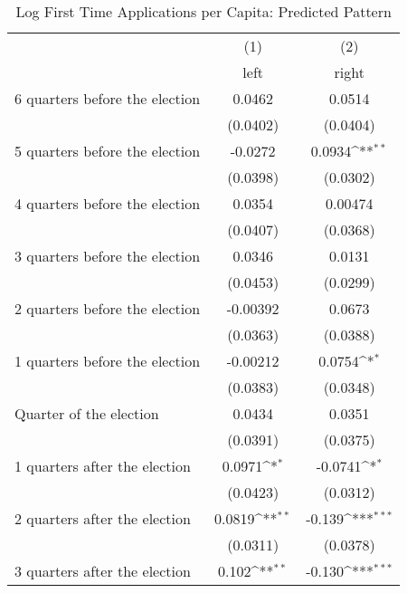 \begin{table}[htbp]\centering
\def\sym#1{\ifmmode^{#1}\else\(^{#1}\)\fi}
\caption{Log First Time Applications per Capita: Predicted Pattern}
\begin{tabular}{l*{2}{c}}
\hline\hline
                    &\multicolumn{1}{c}{(1)}&\multicolumn{1}{c}{(2)}\\
                    &\multicolumn{1}{c}{left}&\multicolumn{1}{c}{right}\\
\hline
 6 quarters before the election&      0.0462         &      0.0514         \\
                    &    (0.0402)         &    (0.0404)         \\
[1em]
 5 quarters before the election&     -0.0272         &      0.0934\sym{**} \\
                    &    (0.0398)         &    (0.0302)         \\
[1em]
 4 quarters before the election&      0.0354         &     0.00474         \\
                    &    (0.0407)         &    (0.0368)         \\
[1em]
 3 quarters before the election&      0.0346         &      0.0131         \\
                    &    (0.0453)         &    (0.0299)         \\
[1em]
 2 quarters before the election&    -0.00392         &      0.0673         \\
                    &    (0.0363)         &    (0.0388)         \\
[1em]
 1 quarters before the election&    -0.00212         &      0.0754\sym{*}  \\
                    &    (0.0383)         &    (0.0348)         \\
[1em]
Quarter of the election&      0.0434         &      0.0351         \\
                    &    (0.0391)         &    (0.0375)         \\
[1em]
 1 quarters after the election&      0.0971\sym{*}  &     -0.0741\sym{*}  \\
                    &    (0.0423)         &    (0.0312)         \\
[1em]
 2 quarters after the election&      0.0819\sym{**} &      -0.139\sym{***}\\
                    &    (0.0311)         &    (0.0378)         \\
[1em]
 3 quarters after the election&       0.102\sym{**} &      -0.130\sym{***}\\

\end{tabular}
\end{table}
